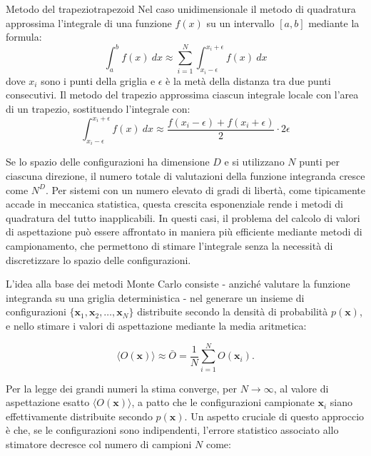 \begin{example}{Metodo del trapezio}{trapezoid}
Nel caso unidimensionale il metodo di quadratura approssima l'integrale di una funzione $f(x)$ su un intervallo $[a,b]$ mediante la formula:
\begin{equation}
\int_a^b f(x) \ dx \approx  \sum_{i=1}^{N} \int_{x_{i}-\epsilon}^{x_{i}+\epsilon} f(x) \ dx
\end{equation}
dove $x_i$ sono i punti della griglia e $\epsilon$ è la metà della distanza tra due punti consecutivi.
Il metodo del trapezio approssima ciascun integrale locale con l'area di un trapezio, sostituendo l'integrale con:
\begin{equation}
\int_{x_{i}-\epsilon}^{x_{i}+\epsilon} f(x) \ dx \approx \frac{f(x_{i}-\epsilon) + f(x_{i}+\epsilon)}{2} \cdot 2\epsilon
\end{equation}
\end{example}

Se lo spazio delle configurazioni ha dimensione $D$ e si utilizzano $N$ punti per ciascuna direzione, il numero totale di valutazioni della funzione integranda cresce come $N^D$. Per sistemi con un numero elevato di gradi di libertà, come tipicamente accade in meccanica statistica, questa crescita esponenziale rende i metodi di quadratura del tutto inapplicabili. In questi casi, il problema del calcolo di valori di aspettazione può essere affrontato in maniera più efficiente mediante metodi di campionamento, che permettono di stimare l'integrale senza la necessità di discretizzare lo spazio delle configurazioni.

L'idea alla base dei metodi Monte Carlo consiste - anziché valutare la funzione integranda su una griglia deterministica - nel generare un insieme di configurazioni $\{\mathbf{x}_1,\mathbf{x}_2,\ldots,\mathbf{x}_N\}$ distribuite secondo la densità di probabilità $p(\mathbf{x})$, e nello stimare i valori di aspettazione mediante la media aritmetica:

\begin{equation}
\langle O(\mathbf{x})\rangle
\approx \bar{O} =
\frac{1}{N}\sum_{i=1}^{N}O(\mathbf{x}_i).
\label{eq:mc_estimator}
\end{equation}

Per la legge dei grandi numeri la stima converge, per $N\rightarrow\infty$, al valore di aspettazione esatto $\langle O(\mathbf{x})\rangle$, a patto che le configurazioni campionate $\mathbf{x}_i$ siano effettivamente distribuite secondo $p(\mathbf{x})$. Un aspetto cruciale di questo approccio è che, se le configurazioni sono indipendenti, l'errore statistico associato allo stimatore decresce col numero di campioni $N$ come:

